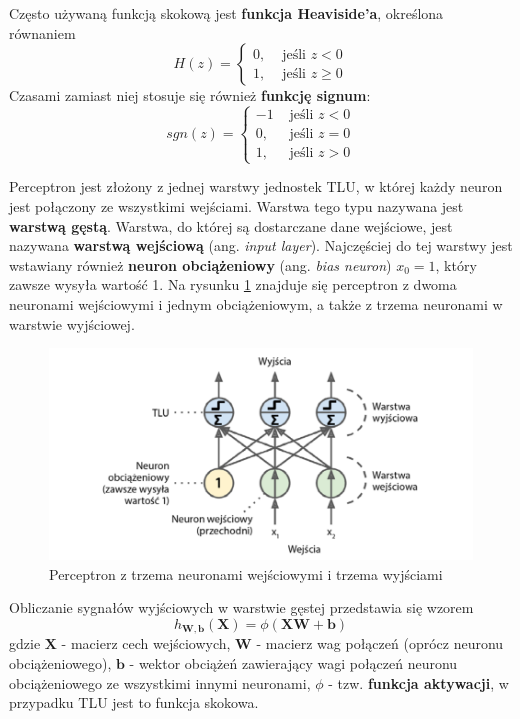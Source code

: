 \documentclass[12pt]{mwbk}
\theoremstyle{plain}
\theoremstyle{definition}
\theoremstyle{remark}
\newcommand\zrodlo[1]{\par\vspace{-3mm}{\small\textit{Źródło: }#1 }}
\begin{document}
\noindent Często używaną funkcją skokową jest \textbf{funkcja Heaviside'a}, określona równaniem 
$$H(z)=\begin{cases}
0, & \text{ jeśli } z<0\\
1, & \text{ jeśli } z \geq 0
\end{cases}$$
Czasami zamiast niej stosuje się również \textbf{funkcję signum}:
$$sgn(z)=\begin{cases}
-1 & \text{ jeśli } z<0\\
0, & \text{ jeśli } z=0\\
1, & \text{ jeśli } z > 0
\end{cases}$$

Perceptron jest złożony z jednej warstwy jednostek TLU, w której każdy neuron jest połączony ze wszystkimi wejściami. Warstwa tego typu nazywana jest \textbf{warstwą gęstą}. Warstwa, do której są dostarczane dane wejściowe, jest nazywana \textbf{warstwą wejściową} (ang. \textit{input layer}). Najczęściej do tej warstwy jest wstawiany również \textbf{neuron obciążeniowy} (ang. \textit{bias neuron}) $x_0=1$, który zawsze wysyła wartość 1.  Na rysunku \ref{fig:perceptron1} znajduje się perceptron z dwoma neuronami wejściowymi i jednym obciążeniowym, a także z trzema neuronami w warstwie wyjściowej.
\begin{figure}[!h]
	\centering
	\includegraphics[width=\linewidth]{rys/perceptron1.png}
	\caption{Perceptron z trzema neuronami wejściowymi i trzema wyjściami}
	\zrodlo{\cite{geron}}
	\label{fig:perceptron1}
\end{figure}




Obliczanie sygnałów wyjściowych w warstwie gęstej przedstawia się wzorem
$$h_{\mathbf{W},\mathbf{b}}(\mathbf{X})=\phi(\mathbf{XW}+\mathbf{b})$$
gdzie $\mathbf{X}$ - macierz cech wejściowych, $\mathbf{W}$ - macierz wag połączeń (oprócz neuronu obciążeniowego), $\mathbf{b}$ - wektor obciążeń zawierający wagi połączeń neuronu obciążeniowego ze wszystkimi innymi neuronami, $\phi$ - tzw. \textbf{funkcja aktywacji}, w przypadku TLU jest to funkcja skokowa.
\end{document}
